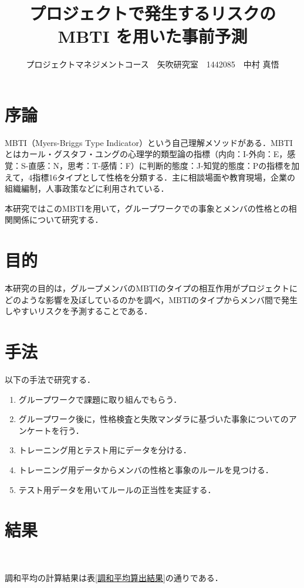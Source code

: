 \documentclass[uplatex,twocolumn,dvipdfmx]{jsarticle}
\title{\vspace{-5mm}\fontsize{14pt}{0pt}\selectfont プロジェクトで発生するリスクのMBTI を用いた事前予測}
\author{\normalsize プロジェクトマネジメントコース　矢吹研究室　1442085　中村 真悟}
\date{}
\begin{document}
\fontsize{10.5pt}{\baselineskip}\selectfont
\maketitle





\section{序論}\label{序論}
MBTI（Myers-Briggs Type Indicator）という自己理解メソッドがある．MBTIとはカール・グスタフ・ユングの心理学的類型論の指標（内向：I-外向：E，感覚：S-直感：N，思考：T-感情：F）に判断的態度：J-知覚的態度：Pの指標を加えて，4指標16タイプとして性格を分類する．主に相談場面や教育現場，企業の組織編制，人事政策などに利用されている\cite{110001230195}．


本研究ではこのMBTIを用いて，グループワークでの事象とメンバの性格との相関関係について研究する．

\section{目的}

本研究の目的は，グループメンバのMBTIのタイプの相互作用がプロジェクトにどのような影響を及ぼしているのかを調べ，MBTIのタイプからメンバ間で発生しやすいリスクを予測することである．
\section{手法}

以下の手法で研究する．
\begin{enumerate}
\item グループワークで課題に取り組んでもらう．
\item グループワーク後に，性格検査と失敗マンダラに基づいた事象についてのアンケートを行う．
\item トレーニング用とテスト用にデータを分ける．
\item トレーニング用データからメンバの性格と事象のルールを見つける．
\item テスト用データを用いてルールの正当性を実証する．
\end{enumerate}
\section{結果}　

調和平均の計算結果は表\ref{調和平均算出結果}の通りである．
\end{document}
